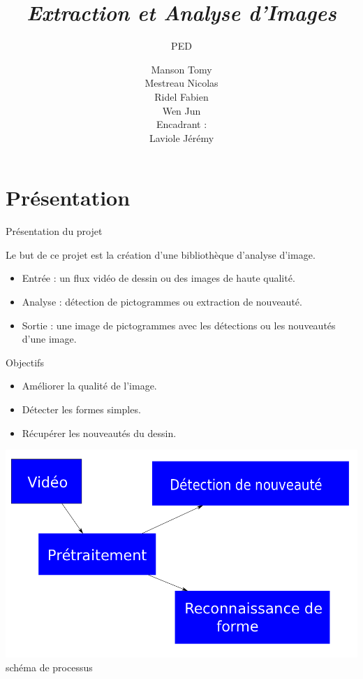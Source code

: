 \documentclass[t,14pt]{beamer}
\title{\textbf{\textit{Extraction et Analyse d'Images}}}
\subtitle{PED}
\author{\scriptsize{Manson Tomy\\
		Mestreau Nicolas\\
		Ridel Fabien\\
		Wen Jun\\
		\vspace{10mm}
		Encadrant : \\
		Laviole Jérémy\\
		}}
\institute{\tiny Université de Bordeaux 1}
\begin{document}
\frame{\titlepage}

\section[Présentation]{Présentation}

\begin{frame}{Présentation du projet}
\begin{center}
\vspace{5mm}
Le but de ce projet est la création d'une bibliothèque d'analyse d'image.

\end{center}
\begin{itemize}
\item Entrée : un flux vidéo de dessin ou des images de haute qualité.
\item Analyse : détection de pictogrammes ou extraction de nouveauté.
\item Sortie : une image de pictogrammes avec les détections ou les nouveautés d'une image.
\end{itemize}
\end{frame}

\begin{frame}{Objectifs}
\vspace{5mm}
\begin{block}{}
\begin{itemize}
\item Améliorer la qualité de l'image.
\item Détecter les formes simples. 
\item Récupérer les nouveautés du dessin.
\end{itemize}
\end{block}
\begin{center}
\includegraphics[scale=0.2]{images/dessin.png} 
\\ schéma de processus
\end{center}
\end{frame}
\end{document}
